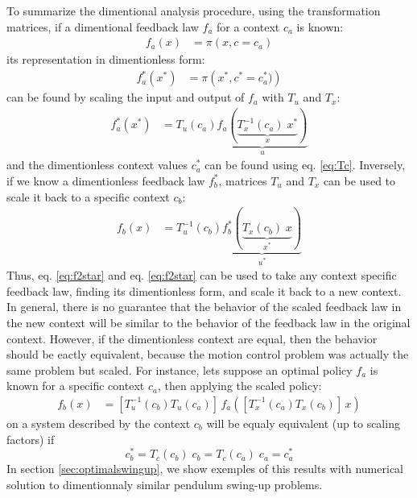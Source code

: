 To summarize the dimentional analysis procedure, using the transformation matrices, if a dimentional feedback law $f_a$ for a context $c_a$ is known:
\begin{align}
f_a ( x ) &= \pi \left( x, c = c_a \right)
\end{align}
its representation in dimentionless form:
\begin{align}
f_a^* ( x^* ) &= \pi \left( x^*, c^* = c_a^* )\right) 
\end{align}
can be found by scaling the input and output of $f_a$ with $T_u$ and $T_x$:
\begin{align}
f_a^* ( x^* ) &= T_u(c_a) 
\underbrace{
f_a \left(  
\underbrace{
T_x^{-1}(c_a) \; x^*
}_{x}
\right)
}_{u}
\label{eq:f2star}
\end{align}
and the dimentionless context values $c^*_a$ can be found using eq. \eqref{eq:Tc}.
Inversely, if we know a dimentionless feedback law $f_b^*$, matrices $T_u$ and $T_x$ can be used to scale it back to a specific context $c_b$:
\begin{align}
f_b ( x ) &= T^{-1}_u(c_b) 
\underbrace{
f_b^* \left(  
\underbrace{
T_x(c_b) \; x
}_{x^*}
\right)
}_{u^*}
\label{eq:star2f}
\end{align}
Thus, eq. \eqref{eq:f2star} and eq. \eqref{eq:f2star} can be used to take any context specific feedback law, finding its dimentionless form, and scale it back to a new context. In general, there is no guarantee that the behavior of the scaled feedback law in the new context will be similar to the behavior of the feedback law in the original context. However, if the dimentionless context are equal, then the behavior should be eactly equivalent, because the motion control problem was actually the same problem but scaled. For instance, lets suppose an optimal policy $f_a$ is known for a specific context $c_a$, then applying the scaled policy:
\begin{align}
f_b ( x ) &= 
\left[ T^{-1}_u(c_b) 
T_u(c_a) \right] \,
f_a \left( 
\left[
T_x^{-1}(c_a) 
T_x(c_b)
\right] \,
x
\right)
\label{eq:ab_transform}
\end{align}
on a system described by the context $c_b$ will be equaly equivalent (up to scaling factors) if 
\begin{equation}
c_b^* =  T_c( c_b ) \; c_b  = T_c( c_a ) \; c_a = c_a^* 
\end{equation}
In section \ref{sec:optimalswingup}, we show exemples of this results with numerical solution to dimentionnaly similar pendulum swing-up problems. 


